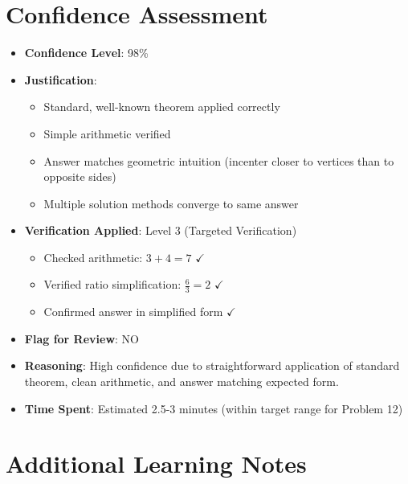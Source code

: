 \documentclass[12pt]{article}
\begin{document}
\section*{Confidence Assessment}
\begin{itemize}[leftmargin=*]
    \item \textbf{Confidence Level}: 98\%
    
    \item \textbf{Justification}: 
    \begin{itemize}
        \item Standard, well-known theorem applied correctly
        \item Simple arithmetic verified
        \item Answer matches geometric intuition (incenter closer to vertices than to opposite sides)
        \item Multiple solution methods converge to same answer
    \end{itemize}
    
    \item \textbf{Verification Applied}: Level 3 (Targeted Verification)
    \begin{itemize}
        \item Checked arithmetic: $3 + 4 = 7$ $\checkmark$
        \item Verified ratio simplification: $\frac{6}{3} = 2$ $\checkmark$
        \item Confirmed answer in simplified form $\checkmark$
    \end{itemize}
    
    \item \textbf{Flag for Review}: NO
    
    \item \textbf{Reasoning}: High confidence due to straightforward application of standard theorem, clean arithmetic, and answer matching expected form.
    
    \item \textbf{Time Spent}: Estimated 2.5-3 minutes (within target range for Problem 12)
\end{itemize}

\section*{Additional Learning Notes}
\end{document}

